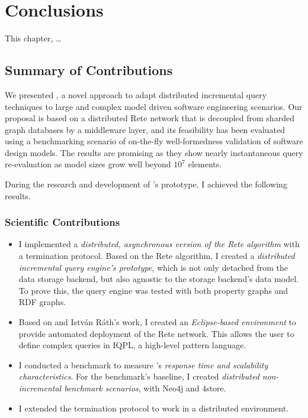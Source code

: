 \chapter{Conclusions}
\label{chap:conclusions}

This chapter, \ldots

\section{Summary of Contributions}

We presented \iqd{}, a novel approach to adapt distributed incremental query techniques to large and complex model driven software engineering scenarios. Our proposal is based on a distributed Rete network that is decoupled from sharded graph databases by a middleware layer, and its feasibility has been evaluated using a benchmarking scenario of on-the-fly well-formedness validation of software design models. The results are promising as they show nearly instantaneous query re-evaluation as model sizes grow well beyond $10^7$ elements.


During the research and development of \iqd{}'s prototype, I achieved the following results.

\subsection{Scientific Contributions}

\begin{itemize}
  \item I implemented a \emph{distributed, asynchronous version of the Rete algorithm} with a termination protocol. Based on the Rete algorithm, I created a \emph{distributed incremental query engine's prototype}, which is not only detached from the data storage backend, but also agnostic to the storage backend's data model. To prove this, the query engine was tested with both property graphs and RDF graphs. 
  \item Based on \eiq{} and István Ráth's work, I created an \emph{Eclipse-based environment} to provide automated deployment of the Rete network. This allows the user to define complex queries in IQPL, a high-level pattern language. %
  \item I conducted a benchmark to measure \iqd{}'s \emph{response time and scalability characteristics}. For the benchmark's baseline, I created \emph{distributed non-incremental benchmark scenarios}, with Neo4j and 4store.
  \item I extended the termination protocol to work in a distributed environment. 
\end{itemize}

